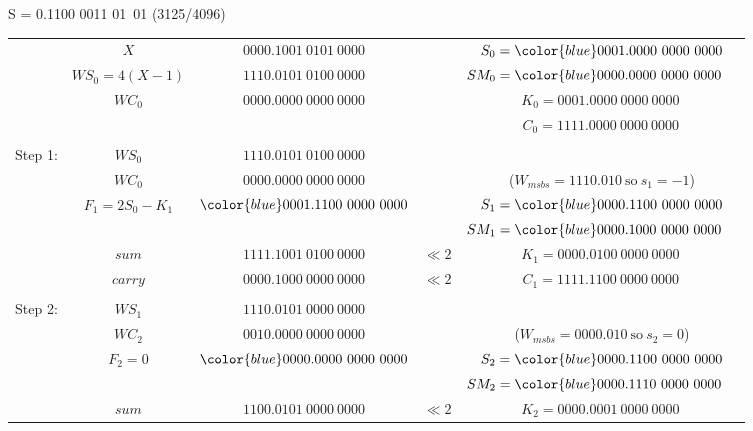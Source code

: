 \documentclass[12pt]{article}
\begin{document}
S = 0.1100 0011 01\ 01 (3125/4096)
{\small
\begin{center}
\begin{tabular}{ccccc}
            &$X             $&$         0000.1001\ 0101\ 0000   $&          &$S_0={\color{blue}0001}.0000\ 0000\ 0000$\\
            &$WS_0=4(X-1)   $&$         1110.0101\ 0100\ 0000   $&          &$SM_0={\color{blue}0000}.0000\ 0000\ 0000\phantom{M}$\\
            &$WC_0          $&$         0000.0000\ 0000\ 0000   $&          &$K_0=0001.0000\ 0000\ 0000\ $\\
            &                &                                   &          &$C_0=1111.0000\ 0000\ 0000\,$\\
    \hdashline\\
    Step 1: &$WS_0          $&$         1110.0101\ 0100\ 0000   $&          &\\
            &$WC_0          $&$         0000.0000\ 0000\ 0000   $&          &($W_{msbs}=1110.010\ \text{so}\ s_1=-1$)\\
            &$F_1=2S_0-K_1  $&${\color{blue}0001.11}00\ 0000\ 0000$&        &$S_1={\color{blue}0000.11}00\ 0000\ 0000$\\
            &                &                                   &          &$SM_1={\color{blue}0000.10}00\ 0000\ 0000\phantom{M}$\\
    \cline{2-3}
            &$sum           $&$         1111.1001\ 0100\ 0000   $&$\ll2    $&$K_1=0000.0100\ 0000\ 0000\ $\\
            &$carry         $&$         0000.1000\ 0000\ 0000   $&$\ll2    $&$C_1=1111.1100\ 0000\ 0000\,$\\
    \hdashline\\    
    Step 2: &$WS_1          $&$         1110.0101\ 0000\ 0000   $&          &\\
            &$WC_2          $&$         0010.0000\ 0000\ 0000   $&          &($W_{msbs}=0000.010\ \text{so}\ s_2=0$)\\
            &$F_2=0       $&${\color{blue}0000.0000}\ 0000\ 0000$&          &$S_2={\color{blue}0000.1100}\ 0000\ 0000$\\
            &                &                                   &          &$SM_2={\color{blue}0000.1110}\ 0000\ 0000\phantom{M}$\\
    \cline{2-3}
            &$sum           $&$         1100.0101\ 0000\ 0000   $&$\ll2    $&$K_2=0000.0001\ 0000\ 0000\ $\\

\end{tabular}
\end{center}}
\end{document}
